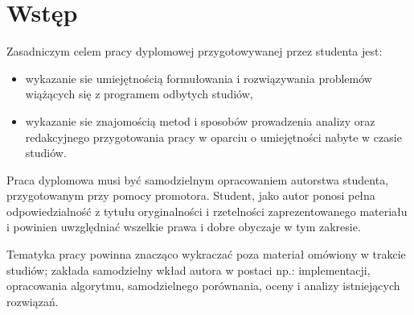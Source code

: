 \chapter*{Wstęp}

Zasadniczym celem pracy dyplomowej przygotowywanej przez studenta jest:

\begin{itemize}
\item wykazanie sie umiejętnością formułowania i rozwiązywania problemów wiążących się z programem odbytych studiów,
\item wykazanie sie znajomością metod i sposobów prowadzenia analizy oraz redakcyjnego przygotowania pracy w oparciu o umiejętności nabyte w czasie studiów.
\end {itemize}

Praca dyplomowa musi być samodzielnym opracowaniem autorstwa studenta, przygotowanym przy pomocy promotora. Student, jako autor ponosi pełna odpowiedzialność z tytułu oryginalności i rzetelności zaprezentowanego materiału i powinien uwzględniać wszelkie prawa i dobre obyczaje w tym zakresie.

Tematyka pracy powinna znacząco wykraczać poza materiał omówiony w trakcie studiów; zakłada samodzielny wkład autora w postaci np.: implementacji, opracowania algorytmu, samodzielnego porównania, oceny i analizy istniejących rozwiązań.



